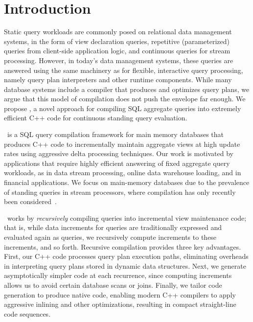 \section{Introduction}
Static query workloads are commonly posed on relational data management systems,
in the form of view declaration queries, repetitive (parameterized) queries from
client-side application logic, and continuous queries for stream processing.
However, in today's data management systems, these queries are answered using the
same machinery as for flexible, interactive query processing, namely query plan
interpreters and other runtime components. While many database systems include a
compiler that produces and optimizes query plans, we argue that this model of
compilation does not push the envelope far enough. We propose \compiler, a novel
approach for compiling SQL aggregate queries into extremely efficient C++ code
for continuous standing query evaluation.

\compiler\ is a SQL query compilation framework for main memory databases that
produces C++ code to incrementally maintain aggregate views at high update rates
using aggressive delta processing techniques. Our work is motivated by
applications that require highly efficient answering of fixed aggregate query
workloads, as in data stream processing, online data warehouse loading, and
in financial applications. We focus on main-memory databases due to the
prevalence of standing queries in stream processors, where compilation has
only recently been considered~\cite{gedik-sigmod:08,sb-patent}.

\compiler\ works by {\em recursively}\/ compiling queries into incremental view
maintenance code; that is, while data increments for queries are traditionally
expressed and evaluated again as queries, we recursively compute increments to
these increments, and so forth. Recursive compilation provides three key
advantages. First, our C++ code processes query plan execution paths, eliminating
overheads in interpreting query plans stored in dynamic data structures. Next, we
generate asymptotically simpler code at each recurrence, since computing
increments allows us to avoid certain database scans or joins. Finally, we tailor
code generation to produce native code, enabling modern C++ compilers to apply
aggressive inlining and other optimizations, resulting in compact straight-line
code sequences.


